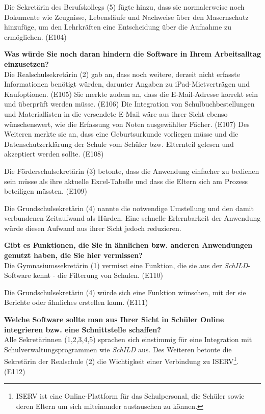 Die Sekretärin des Berufskollegs (5) fügte hinzu, dass sie normalerweise noch Dokumente wie Zeugnisse, Lebensläufe und Nachweise über den Masernschutz hinzufüge, um den Lehrkräften eine Entscheidung über die Aufnahme zu ermöglichen. (E104)

\textbf{Was würde Sie noch daran hindern die Software in Ihrem Arbeitsalltag einzusetzen?}\\
Die Realschulsekretärin (2) gab an, dass noch weitere, derzeit nicht erfasste Informationen benötigt würden, darunter Angaben zu iPad-Mietverträgen und Kaufoptionen. (E105) Sie merkte zudem an, dass die E-Mail-Adresse korrekt sein und überprüft werden müsse. (E106) Die Integration von Schulbuchbestellungen und Materiallisten in die versendete E-Mail wäre aus ihrer Sicht ebenso wünschenswert, wie die Erfassung von Noten ausgewählter Fächer. (E107) Des Weiteren merkte sie an, dass eine Geburtsurkunde vorliegen müsse und die Datenschutzerklärung der Schule vom Schüler bzw. Elternteil gelesen und akzeptiert werden sollte. (E108)

Die Förderschulsekretärin (3) betonte, dass die Anwendung einfacher zu bedienen sein müsse als ihre aktuelle Excel-Tabelle und dass die Eltern sich am Prozess beteiligen müssten. (E109)

Die Grundschulsekretärin (4) nannte die notwendige Umstellung und den damit verbundenen Zeitaufwand als Hürden. Eine schnelle Erlernbarkeit der Anwendung würde diesen Aufwand aus ihrer Sicht jedoch reduzieren. 

\textbf{Gibt es Funktionen, die Sie in ähnlichen bzw. anderen Anwendungen genutzt haben, die Sie hier vermissen?}\\
Die Gymnasiumssekretärin (1) vermisst eine Funktion, die sie aus der \textit{SchILD}-Software kennt - die Filterung von Schulen. (E110)

Die Grundschulsekretärin (4) würde sich eine Funktion wünschen, mit der sie Berichte oder ähnliches erstellen kann. (E111)

\textbf{Welche Software sollte man aus Ihrer Sicht in Schüler Online integrieren bzw. eine Schnittstelle schaffen?}\\
Alle Sekretärinnen (1,2,3,4,5) sprachen sich einstimmig für eine Integration mit Schulverwaltungsprogrammen wie \textit{SchILD} aus. Des Weiteren betonte die Sekretärin der Realschule (2) die Wichtigkeit einer Verbindung zu ISERV\footnote{ISERV ist eine Online-Plattform für das Schulpersonal, die Schüler sowie deren Eltern um sich miteinander austauschen zu können.}. (E112)

